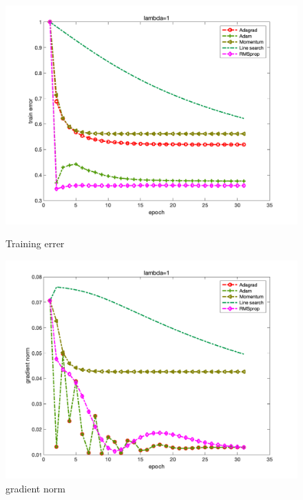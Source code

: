 \documentclass{article}
\begin{document}
\begin{figure}[H]
\begin{minipage}{0.33\linewidth}
	\centering
	\includegraphics[width=1\linewidth]{./fig/fval_g2}
	\caption{Training errer}
\end{minipage}
\begin{minipage}{0.33\linewidth}
	\centering
	\includegraphics[width=1\linewidth]{./fig/gnorm_g2}
	\caption{gradient norm}
\end{minipage}
\begin{minipage}{0.33\linewidth}
	\centering

\end{minipage}
\end{figure}
\end{document}
